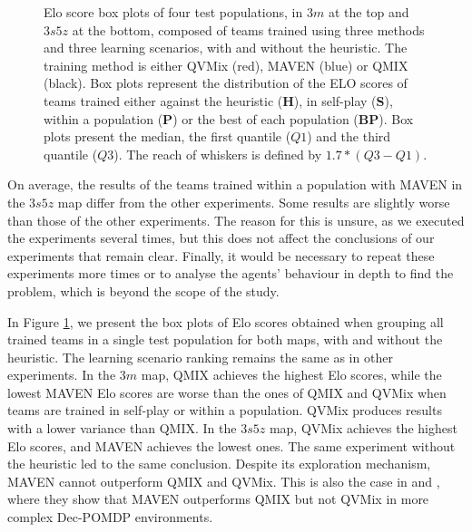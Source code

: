 \begin{figure}[ht]
\begin{subfigure}{\textwidth}
\end{subfigure}
\caption{
Elo score box plots of four test populations, in $3m$ at the top and $3s5z$ at the bottom, composed of teams trained using three methods and three learning scenarios, with and without the heuristic.
The training method is either QVMix (red), MAVEN (blue) or QMIX (black).
Box plots represent the distribution of the ELO scores of teams trained either against the heuristic (\textbf{H}), in self-play (\textbf{S}), within a population (\textbf{P}) or the best of each population (\textbf{BP}).
Box plots present the median, the first quantile ($Q1$) and the third quantile ($Q3$). The reach of whiskers is defined by $1.7*(Q3-Q1)$.
}
\label{fig:all}
\end{figure}

On average, the results of the teams trained within a population with MAVEN in the $3s5z$ map differ from the other experiments. 
Some results are slightly worse than those of the other experiments.
The reason for this is unsure, as we executed the experiments several times, but this does not affect the conclusions of our experiments that remain clear.
Finally, it would be necessary to repeat these experiments more times or to analyse the agents' behaviour in depth to find the problem, which is beyond the scope of the study. 

In Figure \ref{fig:all}, we present the box plots of Elo scores obtained when grouping all trained teams in a single test population for both maps, with and without the heuristic.
The learning scenario ranking remains the same as in other experiments.
In the $3m$ map, QMIX achieves the highest Elo scores, while the lowest MAVEN Elo scores are worse than the ones of QMIX and QVMix when teams are trained in self-play or within a population.
QVMix produces results with a lower variance than QMIX.
In the $3s5z$ map, QVMix achieves the highest Elo scores, and MAVEN achieves the lowest ones.
The same experiment without the heuristic led to the same conclusion.
Despite its exploration mechanism, MAVEN cannot outperform QMIX and QVMix.
This is also the case in \citep{Mahajan2019MAVEN:Exploration} and \citep{leroy2020qvmix}, where they show that MAVEN outperforms QMIX but not QVMix in more complex Dec-POMDP environments.


